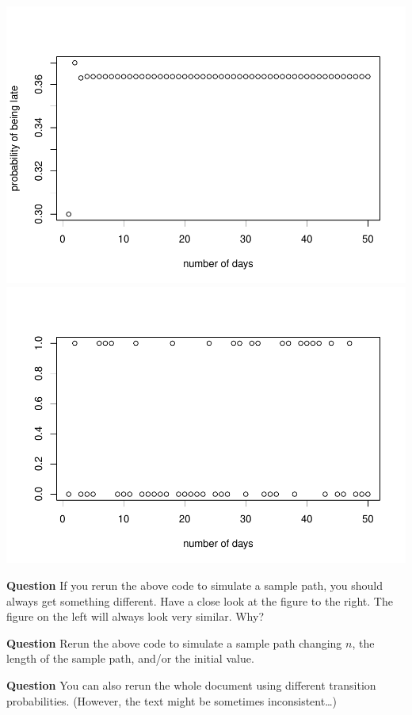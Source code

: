 \documentclass[]{article}
\begin{document}
\includegraphics[width=0.5\linewidth]{simulating-MC_files/figure-latex/plot_sample_path-1}
\includegraphics[width=0.5\linewidth]{simulating-MC_files/figure-latex/plot_sample_path-2}

\textbf{Question} If you rerun the above code to simulate a sample path,
you should always get something different. Have a close look at the
figure to the right. The figure on the left will always look very
similar. Why?

\textbf{Question} Rerun the above code to simulate a sample path
changing \(n\), the length of the sample path, and/or the initial value.

\textbf{Question} You can also rerun the whole document using different
transition probabilities. (However, the text might be sometimes
inconsistent\ldots{})
\end{document}
